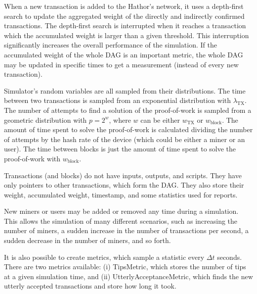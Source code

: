 When a new transaction is added to the Hathor's network, it uses a depth-first search \citep{cormen2009introduction} to update the aggregated weight of the directly and indirectly confirmed transactions. The depth-first search is interrupted when it reaches a transaction which the accumulated weight is larger than a given threshold. This interruption significantly increases the overall performance of the simulation. If the accumulated weight of the whole DAG is an important metric, the whole DAG may be updated in specific times to get a measurement (instead of every new transaction).


Simulator's random variables are all sampled from their distributions. The time between two transactions is sampled from an exponential distribution with $\lambda_\text{TX}$. The number of attempts to find a solution of the proof-of-work is sampled from a geometric distribution with $p=2^{w}$, where $w$ can be either $w_\text{TX}$ or $w_\text{block}$. The amount of time spent to solve the proof-of-work is calculated dividing the number of attempts by the hash rate of the device (which could be either a miner or an user). The time between blocks is just the amount of time spent to solve the proof-of-work with $w_\text{block}$.

Transactions (and blocks) do not have inputs, outputs, and scripts. They have only pointers to other transactions, which form the DAG. They also store their weight, accumulated weight, timestamp, and some statistics used for reports.

New miners or users may be added or removed any time during a simulation. This allows the simulation of many different scenarios, such as increasing the number of miners, a sudden increase in the number of transactions per second, a sudden decrease in the number of miners, and so forth.

It is also possible to create metrics, which sample a statistic every $\Delta t$ seconds. There are two metrics available: (i) TipsMetric, which stores the number of tips at a given simulation time, and (ii) UtterlyAcceptanceMetric, which finds the new utterly accepted transactions and store how long it took.

